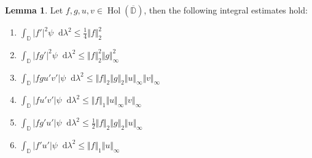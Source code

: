 \documentclass[letterpaper, 11pt]{article}
\newcommand{\D}{\mathbb{D}}
\newcommand{\1}{\mathds{1}}
\newcommand{\dd}{\mathop{}\!\mathrm{d}}
\newcommand{\cl}[1]{\overline{#1}}
\DeclareMathOperator*{\Hol}{Hol}
\theoremstyle{definition}
\newtheorem{lemma}[theorem]{Lemma}
\begin{document}
\begin{lemma} \label{lem:integral-estimates}
  Let $f, g, u, v \in \Hol(\cl{\D})$, then the following integral estimates hold:
  \begin{enumerate}
    \item $ \displaystyle \int_\D \vert f' \vert^2 \psi \dd \lambda^2 \leq \frac{1}{4} \Vert f \Vert_2^2 $
    \item $ \displaystyle \int_\D \vert f g' \vert^2 \psi \dd \lambda^2 \leq \Vert f \Vert_2^2 \Vert g \Vert_\infty^2 $
    \item $ \displaystyle \int_\D \vert f g u' v' \vert \psi \dd \lambda^2 \leq \Vert f \Vert_2 \Vert g \Vert_2 \Vert u \Vert_\infty \Vert v \Vert_\infty $
    \item $ \displaystyle \int_\D \vert f u' v' \vert \psi \dd \lambda^2 \leq \Vert f \Vert_1 \Vert u \Vert_\infty \Vert v \Vert_\infty $
    \item $ \displaystyle \int_\D \vert f g' u' \vert \psi \dd \lambda^2 \leq \frac{1}{2} \Vert f \Vert_2 \Vert g \Vert_2 \Vert u \Vert_\infty $
    \item $ \displaystyle \int_\D \vert f' u' \vert \psi \dd \lambda^2 \leq \Vert f \Vert_1 \Vert u \Vert_\infty $
  \end{enumerate}
\end{lemma}
\end{document}
